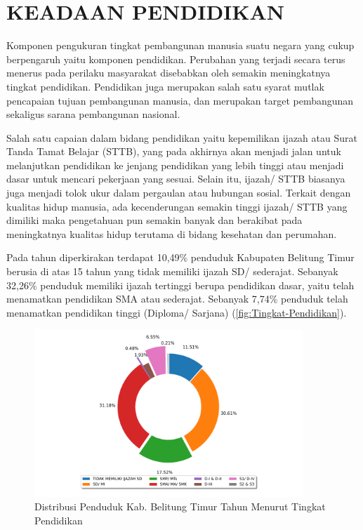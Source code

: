 \section{KEADAAN PENDIDIKAN}
Komponen pengukuran tingkat pembangunan manusia suatu negara yang
cukup berpengaruh yaitu komponen pendidikan. Perubahan yang terjadi
secara terus menerus pada perilaku masyarakat disebabkan oleh semakin
meningkatnya tingkat pendidikan. Pendidikan juga merupakan salah satu
syarat mutlak pencapaian tujuan pembangunan manusia, dan merupakan
target pembangunan sekaligus sarana pembangunan nasional.

Salah satu capaian dalam bidang pendidikan yaitu kepemilikan ijazah
atau Surat Tanda Tamat Belajar (STTB), yang pada akhirnya akan menjadi
jalan untuk melanjutkan pendidikan ke jenjang pendidikan yang lebih
tinggi atau menjadi dasar untuk mencari pekerjaan yang sesuai. Selain
itu, ijazah/ STTB biasanya juga menjadi tolok ukur dalam pergaulan
atau hubungan sosial. Terkait dengan kualitas hidup manusia, ada kecenderungan semakin tinggi
ijazah/ STTB yang dimiliki maka pengetahuan pun semakin banyak dan
berakibat pada meningkatnya kualitas hidup terutama di bidang kesehatan
dan perumahan.

Pada tahun \tP diperkirakan terdapat 10,49\% penduduk Kabupaten Belitung Timur berusia di atas 15 tahun yang tidak memiliki ijazah SD/ sederajat. Sebanyak 32,26\% penduduk memiliki ijazah tertinggi berupa pendidikan dasar, yaitu telah menamatkan pendidikan SMA atau sederajat. Sebanyak 7,74\% penduduk telah menamatkan pendidikan tinggi (Diploma/ Sarjana) (\autoref{fig:Tingkat-Pendidikan}).

\begin{figure}[H]
    \centering
    \includegraphics[width=0.9\textwidth]{bab_01/bab_01_03_distribusiPendidikan}
    \caption{Distribusi Penduduk Kab. Belitung Timur Tahun \tP Menurut Tingkat Pendidikan}
    \label{fig:Tingkat-Pendidikan}
\end{figure}
